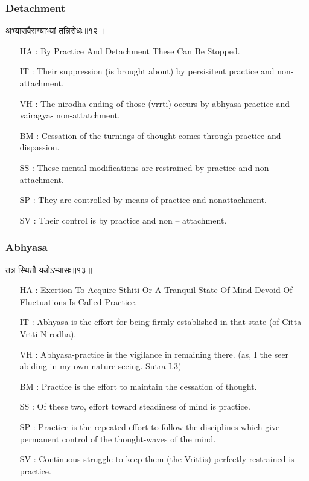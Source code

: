 \begin{frame}[fragile]\frametitle{Detachment}
\begin{sanskrit}
अभ्यासवैराग्याभ्यां तन्निरोधः॥१२॥
\end{sanskrit}

	\begin{itemize}
	\item [HA]: By Practice And Detachment These Can Be Stopped.
	\item [IT]: Their suppression (is brought about) by persisitent practice and non-attachment.
	\item [VH]: The nirodha-ending of those (vrrti) occurs by abhyasa-practice and vairagya- non-attatchment.
	\item [BM]: Cessation of the turnings of thought comes through practice and dispassion.
	\item [SS]: These mental modifications are restrained by practice and non-attachment.
	\item [SP]: They are controlled by means of practice and nonattachment.
	\item [SV]: Their control is by practice and non – attachment.
	\end{itemize}
\end{frame}


\begin{frame}[fragile]\frametitle{Abhyasa}
\begin{sanskrit}
तत्र स्थितौ यत्नोऽभ्यासः॥१३॥
\end{sanskrit}

	\begin{itemize}
	\item [HA]: Exertion To Acquire Sthiti Or A Tranquil State Of Mind Devoid Of Fluctuations Is Called Practice.
	\item [IT]: Abhyasa is the effort for being firmly established in that state (of Citta-Vrtti-Nirodha).
	\item [VH]: Abhyasa-practice is the vigilance in remaining there. (as, I the seer abiding in my own nature seeing. Sutra I.3)
	\item [BM]: Practice is the effort to maintain the cessation of thought.
	\item [SS]: Of these two, effort toward steadiness of mind is practice.
	\item [SP]: Practice is the repeated effort to follow the disciplines which give permanent control of the thought-waves of the mind.
	\item [SV]: Continuous struggle to keep them (the Vrittis) perfectly restrained is practice. 
	\end{itemize}
\end{frame}

